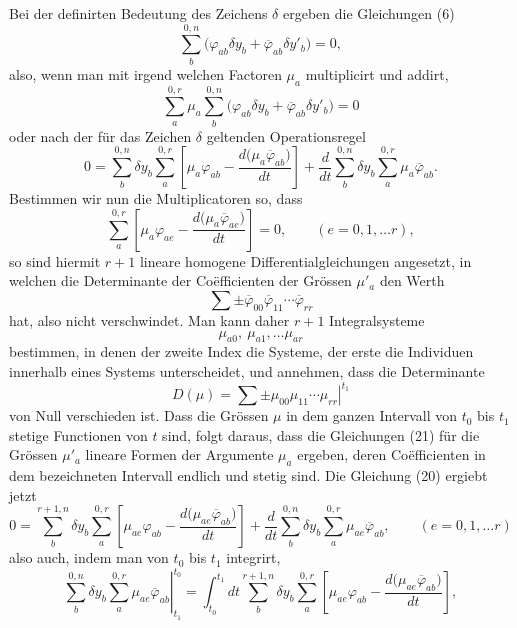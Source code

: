 \documentclass[11pt,a4paper,leqno]{article}
\begin{document}
Bei der definirten Bedeutung des Zeichens $\delta$ ergeben die Gleichungen (6)
\[
\sum_b^{0,n}\bigl(\varphi_{ab}\delta y_b+\overline{\varphi}_{ab}\delta y'_b\bigr)=0,
\]
also, wenn man mit irgend welchen Factoren $\mu_a$ multiplicirt und addirt,
\[
\sum_a^{0,r}\mu_a\sum_b^{0,n}
\bigl(\varphi_{ab}\delta y_b+\overline{\varphi}_{ab}\delta y'_b\bigr)=0
\]
oder nach der für das Zeichen $\delta$ geltenden Operationsregel
\begin{equation}\tag{20}
0=
\sum_b^{0,n}\delta y_b\sum_a^{0,r}
\left[
\mu_a\varphi_{ab}-\frac{d\bigl(\mu_a\overline{\varphi}_{ab}\bigr)}{dt}
\right]
+\frac{d}{dt}\sum_b^{0,n}\delta y_b\sum_a^{0,r}
\mu_a\overline{\varphi}_{ab}.
\end{equation}
Bestimmen wir nun die Multiplicatoren so, dass
\begin{equation}\tag{21}
\sum_a^{0,r}
\left[
\mu_a\varphi_{ae}-\frac{d\bigl(\mu_a\overline{\varphi}_{ae}\bigr)}{dt}
\right]=0,
\qquad(e=0,1,\ldots r),
\end{equation}
so sind hiermit $r+1$ lineare homogene Differentialgleichungen angesetzt, in welchen die Determinante der Coëfficienten der Grössen $\mu'_a$ den Werth
\[
\sum\mathord{\pm}\overline{\varphi}_{00}\overline{\varphi}_{11}\cdots
\overline{\varphi}_{rr}
\]
hat, also nicht verschwindet. Man kann daher $r+1$ Integralsysteme
\begin{equation}\tag{22}
\mu_{a0},\ \mu_{a1},\ldots\mu_{ar}
\end{equation}
bestimmen, in denen der zweite Index die Systeme, der erste die Individuen innerhalb eines Systems unterscheidet, und annehmen, dass die Determinante
\[
D(\mu)=
\left.\sum\mathord{\pm}\mu_{00}\mu_{11}\cdots\mu_{rr}\right|^{t_1}
\]
von Null verschieden ist. Dass die Grössen $\mu$ in dem ganzen Intervall von $t_0$ bis $t_1$ stetige Functionen von $t$ sind, folgt daraus, dass die Gleichungen (21) für die Grössen $\mu'_a$ lineare Formen der Argumente $\mu_a$ ergeben, deren Coëfficienten in dem bezeichneten Intervall endlich und stetig sind. Die Gleichung (20) ergiebt jetzt
\[
0=
\sum_b^{r+1,n}\delta y_b\sum_a^{0,r}
\left[
\mu_{ae}\varphi_{ab}-\frac{d\bigl(\mu_{ae}\overline{\varphi}_{ab}\bigr)}{dt}
\right]
+\frac{d}{dt}\sum_b^{0,n}\delta y_b\sum_a^{0,r}
\mu_{ae}\overline{\varphi}_{ab},
\qquad(e=0,1,\ldots r)
\]
also auch, indem man von $t_0$ bis $t_1$ integrirt,
\[
\left.
\sum_b^{0,n}\delta y_b\sum_a^{0,r}\mu_{ae}\overline{\varphi}_{ab}
\right|_{t_1}^{t_0}
=
\int_{t_0}^{t_1}dt\sum_b^{r+1,n}\delta y_b\sum_a^{0,r}
\left[
\mu_{ae}\varphi_{ab}-\frac{d\bigl(\mu_{ae}\overline{\varphi}_{ab}\bigr)}{dt}
\right],
\]
\end{document}
